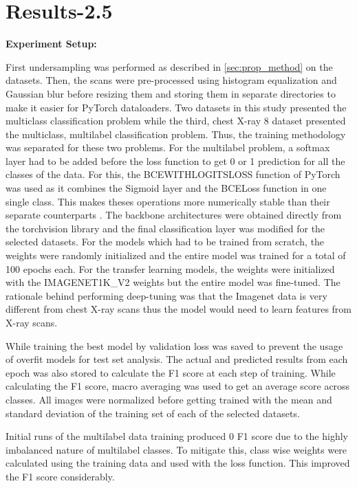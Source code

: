 \documentclass[10pt,twocolumn,letterpaper]{article}
\begin{document}
\section{Results-2.5} 
\label{sec:result}
\textbf{Experiment Setup:}

First undersampling was performed as described in \cref{sec:prop_method} on the datasets. Then,
the scans were pre-processed using histogram equalization and Gaussian blur before resizing them 
and storing them in separate directories to make it easier for PyTorch dataloaders. 
Two datasets in this study presented the multiclass classification problem while the third, 
chest X-ray 8 dataset presented the multiclass, multilabel classification problem. Thus, the 
training methodology was separated for these two problems. For the multilabel problem, 
a softmax layer had to be added before the loss function to get 0 or 1 prediction for 
all the classes of the data. For this, the BCEWITHLOGITSLOSS function of PyTorch was used 
as it combines the Sigmoid layer and the BCELoss function in one single class. This makes 
theses operations more numerically stable than their separate counterparts \cite{bcelogits}.
The backbone architectures were obtained directly from the torchvision library and the final 
classification layer was modified for the selected datasets. For the models which had to be 
trained from scratch, the weights were randomly initialized and the entire model was trained 
for a total of 100 epochs each. For the transfer learning models, the weights were initialized 
with the IMAGENET1K\_V2 weights but the entire model was fine-tuned. The rationale behind 
performing deep-tuning was that the Imagenet data is very different from chest X-ray scans 
thus the model would need to learn features from X-ray scans. 

While training the best model by validation loss was saved to prevent the usage of overfit 
models for test set analysis. The actual and predicted results from each epoch was also stored 
to calculate the F1 score at each step of training. While calculating the F1 score, macro averaging 
was used to get an average score across classes. All images were normalized before getting trained 
with the mean and standard deviation of the training set of each of the selected datasets.

Initial runs of the multilabel data training produced 0 F1 score due to the highly imbalanced 
nature of multilabel classes. To mitigate this, class wise weights were calculated using the training 
data and used with the loss function. This improved the F1 score considerably. 
\end{document}
